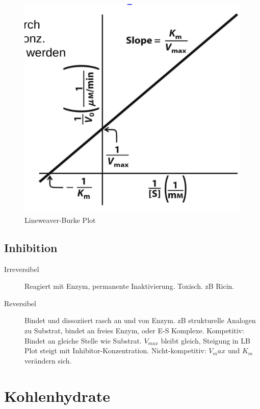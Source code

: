 \documentclass[a4paper,twocolumn,english,fontsize=7,DIV=16]{scrartcl}
\begin{document}
\begin{figure}
	\centering
	\includegraphics[width=\linewidth]{img/lb.png}
	\caption{Lineweaver-Burke Plot}
\end{figure}

\subsection{Inhibition}

\begin{description}
	\item[Irreversibel] Reagiert mit Enzym, permanente Inaktivierung.
		Toxisch. zB Ricin.
	\item[Reversibel] Bindet und dissoziiert rasch an und von Enzym. zB
		strukturelle Analogen zu Substrat, bindet an freies Enzym, oder
		E-S Komplexe. Kompetitiv: Bindet an gleiche Stelle wie
		Substrat. $V_{max}$ bleibt gleich, Steigung in LB Plot steigt
		mit Inhibitor-Konzentration. Nicht-kompetitiv: $V_max$ und
		$K_m$ verändern sich.
\end{description}

\section{Kohlenhydrate}
\end{document}
